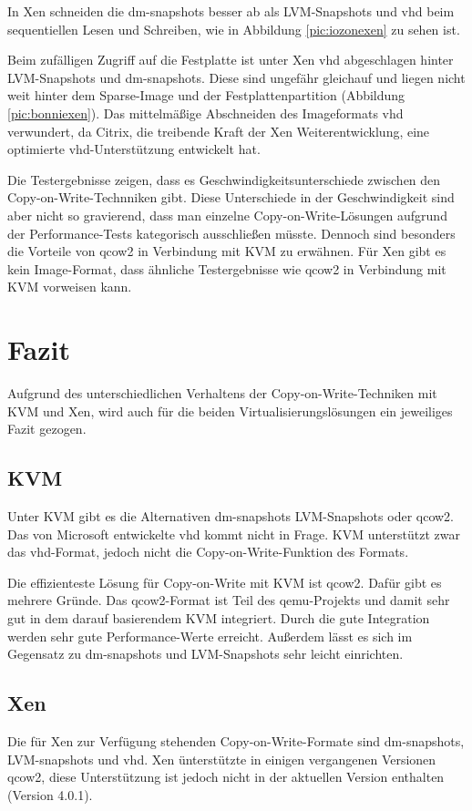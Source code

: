 In Xen schneiden die dm-snapshots besser ab als LVM-Snapshots und vhd beim sequentiellen Lesen und Schreiben, wie in Abbildung \ref{pic:iozonexen} zu sehen ist. 

Beim zufälligen Zugriff auf die Festplatte ist unter Xen vhd abgeschlagen hinter LVM-Snapshots und dm-snapshots. Diese sind ungefähr gleichauf und liegen nicht weit hinter dem Sparse-Image und der Festplattenpartition (Abbildung \ref{pic:bonniexen}). Das mittelmäßige Abschneiden des Imageformats vhd verwundert, da Citrix, die treibende Kraft der Xen Weiterentwicklung, eine optimierte vhd-Unterstützung entwickelt hat. \cite{citrixvhd}

Die Testergebnisse zeigen, dass es Geschwindigkeitsunterschiede zwischen den Copy-on-Write-Technniken gibt. Diese Unterschiede in der Geschwindigkeit sind aber nicht so gravierend, dass man einzelne Copy-on-Write-Lösungen aufgrund der Performance-Tests kategorisch ausschließen müsste. Dennoch sind besonders die Vorteile von qcow2 in Verbindung mit KVM zu erwähnen. Für Xen gibt es kein Image-Format, dass ähnliche Testergebnisse wie qcow2 in Verbindung mit KVM vorweisen kann. 

\section{Fazit}
Aufgrund des unterschiedlichen Verhaltens der Copy-on-Write-Techniken mit KVM und Xen, wird auch für die beiden Virtualisierungslösungen ein jeweiliges Fazit gezogen.

\subsection{KVM}
Unter KVM gibt es die Alternativen dm-snapshots LVM-Snapshots oder qcow2. Das von Microsoft entwickelte vhd kommt nicht in Frage. KVM unterstützt zwar das vhd-Format, jedoch nicht die Copy-on-Write-Funktion des Formats. 

Die effizienteste Lösung für Copy-on-Write mit KVM ist qcow2. Dafür gibt es mehrere Gründe. Das qcow2-Format ist Teil des qemu-Projekts und damit sehr gut in dem darauf basierendem KVM integriert. Durch die gute Integration werden sehr gute Performance-Werte erreicht. Außerdem lässt es sich im Gegensatz zu dm-snapshots und LVM-Snapshots sehr leicht einrichten.

\subsection{Xen}
Die für Xen zur Verfügung stehenden Copy-on-Write-Formate sind dm-snapshots, LVM-snapshots und vhd. Xen ünterstützte in einigen vergangenen Versionen qcow2, diese Unterstützung ist jedoch nicht in der aktuellen Version enthalten (Version 4.0.1). \cite{qcow2support}

